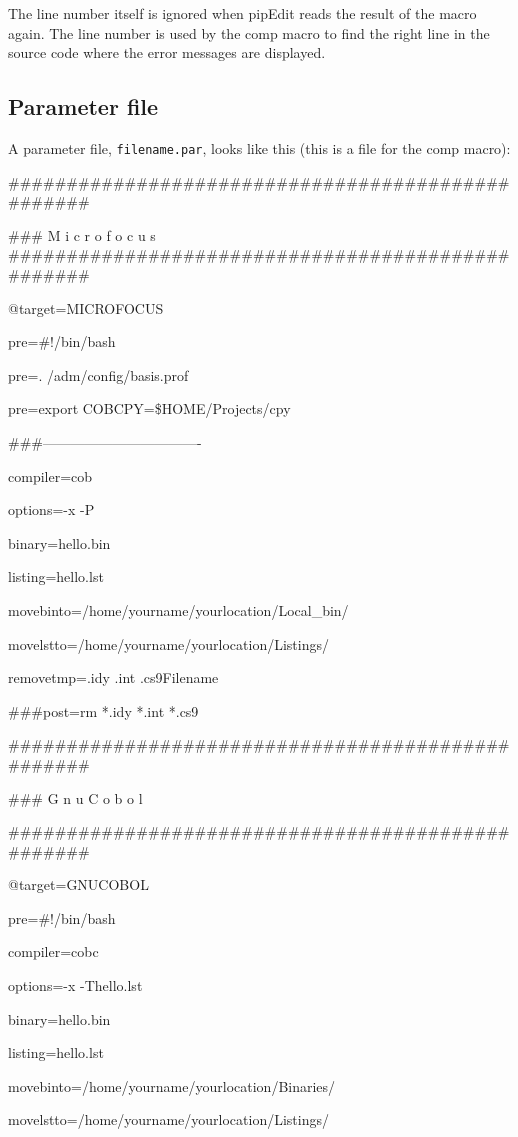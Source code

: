 \documentclass{report}
\begin{document}
The line number itself is ignored when pipEdit reads the result of the macro again. The line number is used by the comp macro to find the right line in the source code where the error messages are displayed.

\pagebreak
\subsection{Parameter file}
A parameter file, \texttt{filename.par}, looks like this (this is a file for the comp macro):

\#\#\#\#\#\#\#\#\#\#\#\#\#\#\#\#\#\#\#\#\#\#\#\#\#\#\#\#\#\#\#\#\#\#\#\#\#\#\#\#\#\#\#\#\#\#\#\#\#\#

\#\#\# M i c r o f o c u s \#\#\#\#\#\#\#\#\#\#\#\#\#\#\#\#\#\#\#\#\#\#\#\#\#\#\#\#\#\#\#\#\#\#\#\#\#\#\#\#\#\#\#\#\#\#\#\#\#\#

@target=MICROFOCUS

pre=\#!/bin/bash

pre=. /adm/config/basis.prof

pre=export COBCPY=\$HOME/Projects/cpy

\#\#\#----------------------------------

compiler=cob

options=-x -P

binary=hello.bin

listing=hello.lst

movebinto=/home/yourname/yourlocation/Local\_bin/

movelstto=/home/yourname/yourlocation/Listings/

removetmp=.idy .int .cs9Filename

\#\#\#post=rm *.idy *.int *.cs9

\#\#\#\#\#\#\#\#\#\#\#\#\#\#\#\#\#\#\#\#\#\#\#\#\#\#\#\#\#\#\#\#\#\#\#\#\#\#\#\#\#\#\#\#\#\#\#\#\#\#

\#\#\# G n u C o b o l 

\#\#\#\#\#\#\#\#\#\#\#\#\#\#\#\#\#\#\#\#\#\#\#\#\#\#\#\#\#\#\#\#\#\#\#\#\#\#\#\#\#\#\#\#\#\#\#\#\#\#

@target=GNUCOBOL

pre=\#!/bin/bash

compiler=cobc

options=-x -Thello.lst

binary=hello.bin

listing=hello.lst

movebinto=/home/yourname/yourlocation/Binaries/

movelstto=/home/yourname/yourlocation/Listings/
\end{document}
